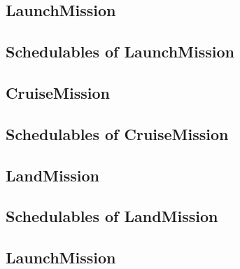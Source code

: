 \documentclass[10pt,a4paper]{article}
\begin{document}

\newpage


\subsection{LaunchMission}

\newpage

\subsection{Schedulables of LaunchMission}


\newpage


\subsection{CruiseMission}

\newpage

\subsection{Schedulables of CruiseMission}


\newpage


\newpage


\newpage


\subsection{LandMission}

\newpage

\subsection{Schedulables of LandMission}


\newpage


\newpage


\newpage


\subsection{LaunchMission}

\newpage
\end{document}
